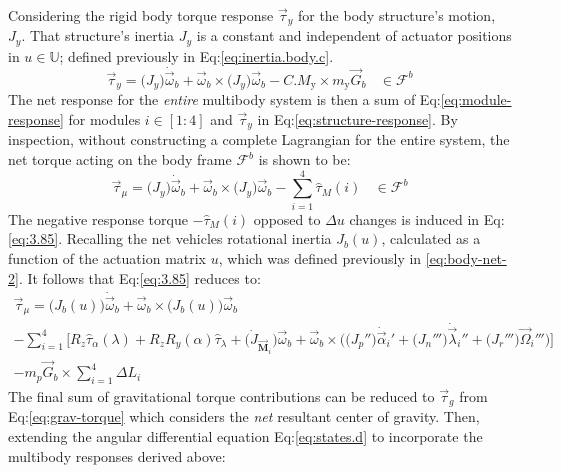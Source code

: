 Considering the rigid body torque response $\vec{\tau}_y$ for the body structure's motion, $J_y$. That structure's inertia $J_y$ is a constant and independent of actuator positions in $u\in\mathbb{U}$; defined previously in Eq:\ref{eq:inertia.body.c}.
\begin{equation}\label{eq:structure-response}
\vec{\tau}_y=\big(J_y\big)\dot{\vec{\omega}}_b+\vec{\omega}_b\times\big(J_y\big)\vec{\omega}_b-C.M_\text{y}\times m_\text{y}\vec{G}_b~~~~\in\mathcal{F}^b
\end{equation}
The net response for the \emph{entire} multibody system is then a sum of Eq:\ref{eq:module-response} for modules $i\in[1:4]$ and $\vec{\tau}_y$ in Eq:\ref{eq:structure-response}. By inspection, without constructing a complete Lagrangian for the entire system, the net torque acting on the body frame $\mathcal{F}^b$ is shown to be:
\begin{equation}\label{eq:3.85}
\vec{\tau}_\mu = \big(J_y\big)\dot{\vec{\omega}}_b+\vec{\omega}_b\times\big(J_y\big)\vec{\omega}_b-\sum_{i=1}^{4}\hat{\tau}_{M}(i)~~~~\in\mathcal{F}^b
\end{equation}
The negative response torque $-\hat{\tau}_{M}(i)$ opposed to $\Delta u$ changes is induced in Eq:\ref{eq:3.85}. Recalling the net vehicles rotational inertia $J_b(u)$, calculated as a function of the actuation matrix $u$, which was defined previously in \ref{eq:body-net-2}. It follows that Eq:\ref{eq:3.85} reduces to:
\begin{multline}\label{eq:3.109}
\vec{\tau}_\mu=\big(J_b(u)\big)\dot{\vec{\omega}}_b+\vec{\omega}_b\times\big(J_b(u)\big)\vec{\omega}_b
\\
-\sum_{i=1}^{4}\Big[R_z\hat{\tau}_\alpha(\lambda)+R_zR_y(\alpha)\hat{\tau}_\lambda+\big(\dot{J}_{\vec{\mathbf{M}}_i}\big)\vec{\omega}_b+\vec{\omega}_b\times\Big(\big(J_p''\big)\dot{\vec{\alpha}}_i'+\big(J_n'''\big)\dot{\vec{\lambda}}_i''+\big(J_r'''\big)\vec{\Omega}_i'''\Big)\Big]
\\
-m_p\vec{G}_b\times\sum_{i=1}^{4}\Delta L_i
\end{multline}
The final sum of gravitational torque contributions can be reduced to $\vec{\tau}_g$ from Eq:\ref{eq:grav-torque} which considers the \emph{net} resultant center of gravity. Then, extending the angular differential equation Eq:\ref{eq:states.d} to incorporate the multibody responses derived above:
